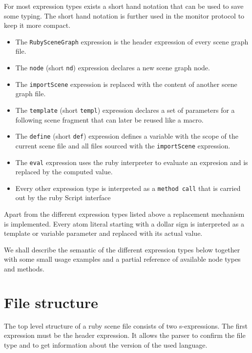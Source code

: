 For most expression types exists a short hand notation that can be
used to save some typing. The short hand notation is further used in
the monitor protocol to keep it more compact.

\begin{itemize}
  
\item The \texttt{RubySceneGraph} expression is the header expression
  of every scene graph file.

\item The \texttt{node} (short \texttt{nd}) expression declares a new scene graph node.  

\item The \texttt{importScene} expression is replaced with the content
  of another scene graph file.
  
\item The \texttt{template} (short \texttt{templ}) expression declares a set of parameters
  for a following scene fragment that can later be reused like a
  macro.

\item The \texttt{define} (short \texttt{def}) expression defines a variable with the scope 
  of the current scene file and all files sourced with the
  \texttt{importScene} expression.

\item The \texttt{eval} 
expression uses the ruby interpreter to evaluate an expresion and is
replaced by the computed value.
 
\item Every other expression type is interpreted as a \texttt{method
    call} that is carried out by the ruby Script interface

\end{itemize}

Apart from the different expression types listed above a replacement
mechanism is implemented. Every atom literal starting with a dollar
sign is interpreted as a template or variable parameter and replaced
with its actual value.

We shall describe the semantic of the different expression types below
together with some small usage examples and a partial reference of
available node types and methods.

\section{File structure}

The top level structure of a ruby scene file consists of two
s-expressions. The first expression must be the header expression. It
allows the parser to confirm the file type and to get information
about the version of the used language.

